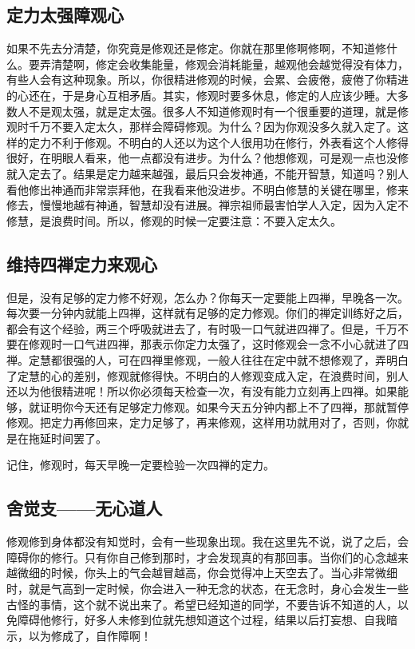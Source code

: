 \documentclass{book}
\begin{document}
\subsection{定力太强障观心}

如果不先去分清楚，你究竟是修观还是修定。你就在那里修啊修啊，不知道修什么。要弄清楚啊，修定会收集能量，修观会消耗能量，越观他会越觉得没有体力，有些人会有这种现象。所以，你很精进修观的时候，会累、会疲倦，疲倦了你精进的心还在，于是身心互相矛盾。其实，修观时要多休息，修定的人应该少睡。大多数人不是观太强，就是定太强。很多人不知道修观时有一个很重要的道理，就是修观时千万不要入定太久，那样会障碍修观。为什么？因为你观没多久就入定了。这样的定力不利于修观。不明白的人还以为这个人很用功在修行，外表看这个人修得很好，在明眼人看来，他一点都没有进步。为什么？他想修观，可是观一点也没修就入定去了。结果是定力越来越强，最后只会发神通，不能开智慧，知道吗？别人看他修出神通而非常崇拜他，在我看来他没进步。不明白修慧的关键在哪里，修来修去，慢慢地越有神通，智慧却没有进展。禅宗祖师最害怕学人入定，因为入定不修慧，是浪费时间。所以，修观的时候一定要注意：不要入定太久。

\subsection{维持四禅定力来观心}

但是，没有足够的定力修不好观，怎么办？你每天一定要能上四禅，早晚各一次。每次要一分钟内就能上四禅，这样就有足够的定力修观。你们的禅定训练好之后，都会有这个经验，两三个呼吸就进去了，有时吸一口气就进四禅了。但是，千万不要在修观时一口气进四禅，那表示你定力太强了，这时修观会一念不小心就进了四禅。定慧都很强的人，可在四禅里修观，一般人往往在定中就不想修观了，弄明白了定慧的心的差别，修观就修得快。不明白的人修观变成入定，在浪费时间，别人还以为他很精进呢！所以你必须每天检查一次，有没有能力立刻再上四禅。如果能够，就证明你今天还有足够定力修观。如果今天五分钟内都上不了四禅，那就暂停修观。把定力再修回来，定力足够了，再来修观，这样用功就用对了，否则，你就是在拖延时间罢了。

记住，修观时，每天早晚一定要检验一次四禅的定力。

\subsection{舍觉支——无心道人}

修观修到身体都没有知觉时，会有一些现象出现。我在这里先不说，说了之后，会障碍你的修行。只有你自己修到那时，才会发现真的有那回事。当你们的心念越来越微细的时候，你头上的气会越冒越高，你会觉得冲上天空去了。当心非常微细时，就是气高到一定时候，你会进入一种无念的状态，在无念时，身心会发生一些古怪的事情，这个就不说出来了。希望已经知道的同学，不要告诉不知道的人，以免障碍他修行，好多人未修到位就先想知道这个过程，结果以后打妄想、自我暗示，以为修成了，自作障啊！
\end{document}
